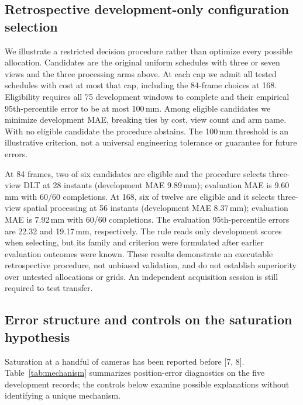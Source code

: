 \documentclass{iopjournal}
\begin{document}
\subsection{Retrospective development-only configuration selection}
\label{sec:selection}
We illustrate a restricted decision procedure rather than optimize every
possible allocation. Candidates are the original uniform schedules with
three or seven views and the three processing arms above. At each cap we
admit all tested schedules with cost at most that cap, including the
84-frame choices at 168. Eligibility requires all 75 development windows
to complete and their empirical 95th-percentile error to be at most
100\,mm. Among eligible candidates we minimize development MAE, breaking
ties by cost, view count and arm name. With no eligible candidate the
procedure abstains. The 100\,mm threshold is an illustrative criterion,
not a universal engineering tolerance or guarantee for future errors.

At 84 frames, two of six candidates are eligible and the procedure selects
three-view DLT at 28 instants (development MAE 9.89\,mm); evaluation MAE
is 9.60\,mm with 60/60 completions. At 168, six of twelve are eligible and
it selects three-view spatial processing at 56 instants (development MAE
8.37\,mm); evaluation MAE is 7.92\,mm with 60/60 completions. The evaluation
95th-percentile errors are 22.32 and 19.17\,mm, respectively. The rule reads
only development scores when selecting, but its family and criterion were
formulated after earlier evaluation outcomes were known. These results
demonstrate an executable retrospective procedure, not unbiased validation,
and do not establish superiority over untested allocations or grids.
An independent acquisition session is still required to test transfer.

\subsection{Error structure and controls on the saturation hypothesis}
\label{sec:mechanism}
Saturation at a handful of cameras has been reported before [7, 8].
Table~\ref{tab:mechanism} summarizes position-error diagnostics on the five
development records; the controls below examine possible explanations without
identifying a unique mechanism.
\end{document}
